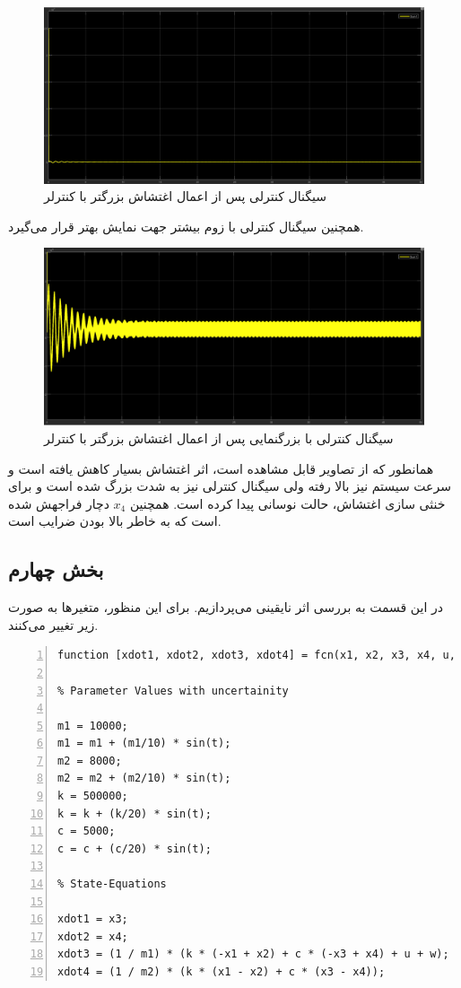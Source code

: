 \documentclass[14pt, a4paper]{extarticle}
\begin{document}
\begin{figure}[h!]
	\centering
	\includegraphics[scale = 0.4]{Q2_3_2_control1.png}
	\caption{سیگنال کنترلی پس از اعمال اغتشاش بزرگتر با کنترلر 
		}
\end{figure}

\newpage
همچنین سیگنال کنترلی با زوم بیشتر جهت نمایش بهتر قرار می‌گیرد.
\begin{figure}[h!]
	\centering
	\includegraphics[scale = 0.4]{Q2_3_2_control2.png}
	\caption{سیگنال کنترلی با بزرگنمایی پس از اعمال اغتشاش بزرگتر با کنترلر 
		}
\end{figure}

همانطور که از تصاویر قابل مشاهده است،‌ اثر اغتشاش بسیار کاهش یافته است و سرعت سیستم نیز بالا رفته ولی سیگنال کنترلی نیز به شدت بزرگ شده است و برای خنثی سازی اغتشاش، حالت نوسانی پیدا کرده است. همچنین 
$x_4$
دچار فراجهش شده است که به خاطر بالا بودن ضرایب
است.

\newpage
\subsection{بخش چهارم}
در این قسمت به بررسی اثر نایقینی می‌پردازیم. برای این منظور، متغیرها به صورت زیر تغییر می‌کنند.
\begin{latin}
	\begin{lstlisting}[frame=single,numbers=left,style=Matlab-Pyglike]
function [xdot1, xdot2, xdot3, xdot4] = fcn(x1, x2, x3, x4, u, w, t)

% Parameter Values with uncertainity

m1 = 10000;
m1 = m1 + (m1/10) * sin(t);
m2 = 8000;
m2 = m2 + (m2/10) * sin(t);
k = 500000;
k = k + (k/20) * sin(t);
c = 5000;
c = c + (c/20) * sin(t);

% State-Equations

xdot1 = x3;
xdot2 = x4;
xdot3 = (1 / m1) * (k * (-x1 + x2) + c * (-x3 + x4) + u + w);
xdot4 = (1 / m2) * (k * (x1 - x2) + c * (x3 - x4));
	\end{lstlisting}
\end{latin}	
\end{document}
